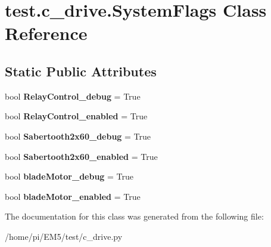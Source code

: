 \hypertarget{classtest_1_1c__drive_1_1SystemFlags}{}\section{test.\+c\+\_\+drive.\+System\+Flags Class Reference}
\label{classtest_1_1c__drive_1_1SystemFlags}
\subsection*{Static Public Attributes}
\begin{DoxyCompactItemize}
\item 
\mbox{\label{classtest_1_1c__drive_1_1SystemFlags_a181613069214b48620971d25b5a60640}} 
bool {\bfseries Relay\+Control\+\_\+debug} = True
\item 
\mbox{\label{classtest_1_1c__drive_1_1SystemFlags_abb01d0479c2d085765a8a67daabb88dd}} 
bool {\bfseries Relay\+Control\+\_\+enabled} = True
\item 
\mbox{\label{classtest_1_1c__drive_1_1SystemFlags_a4abf536be12ec66c6d9080117c6d4b8f}} 
bool {\bfseries Sabertooth2x60\+\_\+debug} = True
\item 
\mbox{\label{classtest_1_1c__drive_1_1SystemFlags_a52aaea4bbe013c172a8f4764c415851a}} 
bool {\bfseries Sabertooth2x60\+\_\+enabled} = True
\item 
\mbox{\label{classtest_1_1c__drive_1_1SystemFlags_ad1f56f8accfb56fffc66d192d9ad6d42}} 
bool {\bfseries blade\+Motor\+\_\+debug} = True
\item 
\mbox{\label{classtest_1_1c__drive_1_1SystemFlags_af3d793ed609275f3e0043fb673ca2b01}} 
bool {\bfseries blade\+Motor\+\_\+enabled} = True
\end{DoxyCompactItemize}


The documentation for this class was generated from the following file\+:\begin{DoxyCompactItemize}
\item 
/home/pi/\+E\+M5/test/c\+\_\+drive.\+py\end{DoxyCompactItemize}
